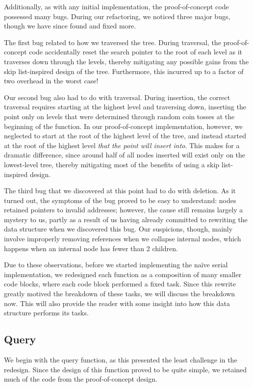 \documentclass[10pt]{article}
\begin{document}
Additionally, as with any initial implementation, the proof-of-concept code possessed many bugs. During our refactoring, we noticed three major bugs, though we have since found and fixed more.

The first bug related to how we traversed the tree. During traversal, the proof-of-concept code accidentally reset the search pointer to the root of each level as it traverses down through the levels, thereby mitigating any possible gains from the skip list-inspired design of the tree. Furthermore, this incurred up to a factor of two overhead in the worst case!

Our second bug also had to do with traversal. During insertion, the correct traversal requires starting at the highest level and traversing down, inserting the point only on levels that were determined through random coin tosses at the beginning of the function. In our proof-of-concept implementation, however, we neglected to start at the root of the highest level of the tree, and instead started at the root of the highest level \textit{that the point will insert into}. This makes for a dramatic difference, since around half of all nodes inserted will exist only on the lowest-level tree, thereby mitigating most of the benefits of using a skip list-inspired design.

The third bug that we discovered at this point had to do with deletion. As it turned out, the symptoms of the bug proved to be easy to understand: nodes retained pointers to invalid addresses; however, the cause still remains largely a mystery to us, partly as a result of us having already committed to rewriting the data structure when we discovered this bug. Our suspicions, though, mainly involve improperly removing references when we collapse internal nodes, which happens when an internal node has fewer than 2 children.

Due to these observations, before we started implementing the na\"ive serial implementation, we redesigned each function as a composition of many smaller code blocks, where each code block performed a fixed task. Since this rewrite greatly motived the breakdown of these tasks, we will discuss the breakdown now. This will also provide the reader with some insight into how this data structure performs its tasks.

\subsection{Query}
We begin with the query function, as this presented the least challenge in the redesign. Since the design of this function proved to be quite simple, we retained much of the code from the proof-of-concept design.
\end{document}
